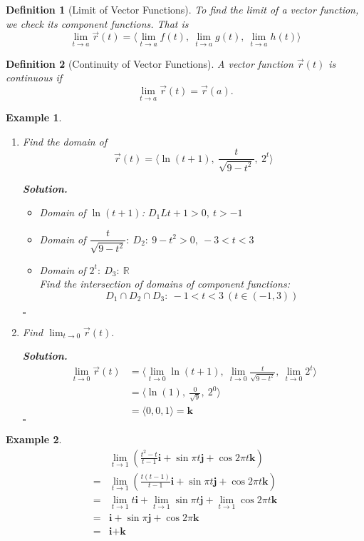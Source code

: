 \documentclass[12pt,a4paper]{article}
\newtheorem{df}{Definition}[subsection]
\newtheorem{eg}{Example}[subsection]
\newenvironment*{sol}{\par\indent\textbf{Solution. }}{\hfill{$\square$}\par}
\def\R{{\mathbb{R}}}
\def\vecr{\vec{r}}
\def\veci{\boldsymbol{\textbf{i}}}
\def\vecj{\boldsymbol{\textbf{j}}}
\def\veck{\boldsymbol{\textbf{k}}}
\begin{document}
\begin{df}[Limit of Vector Functions]
	To find the limit of a vector function, we check its component functions. That is \[\lim_{t\to a}\vecr(t)=\Big\langle\lim_{t\to a}f(t),\ \lim_{t\to a}g(t),\ \lim_{t\to a}h(t)\Big\rangle\]	
\end{df}
\begin{df}[Continuity of Vector Functions]
	A vector function $\vecr(t)$ is continuous if \[\lim_{t\to a}\vecr(t)=\vecr(a).\]	
\end{df}
\begin{eg}
	\begin{enumerate}
		\item Find the domain of \[\vecr(t)=\Big\langle\ln(t+1),\ \frac{t}{\sqrt{9-t^2}},\ 2^t\Big\rangle\]
		\begin{sol}
			\begin{itemize}
				\item Domain of $\ln(t+1)$: $D_1L t+1>0,\ t>-1$
				\item Domain of $\dfrac{t}{\sqrt{9-t^2}}:\ D_2:\ 9-t^2>0,\ -3<t<3$
				\item Domain of $2^t:\ D_3:\ \R$\\
				Find the intersection of domains of component functions: \[D_1\cap D_2\cap D_3:\ -1<t<3\ (t\in(-1,3))\]
			\end{itemize}	
		\end{sol}
		\item Find $\displaystyle\lim_{t\to0}\vecr(t).$
		\begin{sol}
			\[\begin{aligned}
			\lim_{t\to0}\vecr(t)&=\Big\langle\lim_{t\to0}\ln(t+1),\ \lim_{t\to0}\frac{t}{\sqrt{9-t^2}},\ \lim_{t\to0}2^t\Big\rangle\\
			&=\big\langle\ln(1),\ \frac{0}{\sqrt{9}},\ 2^0\big\rangle\\
			&=\langle0,0,1\rangle=\veck
			\end{aligned}\]
		\end{sol}
	\end{enumerate}	
\end{eg}
\begin{eg}
	\[\begin{aligned}
		&\lim_{t\to1}\left(\frac{t^2-t}{t-1}\veci+\sin\pi t\vecj+\cos2\pi t\veck\right)\\
		=&\lim_{t\to1}\left(\frac{t(t-1)}{t-1}\veci+\sin\pi t\vecj+\cos2\pi t\veck\right)\\
		=&\lim_{t\to1}t\veci+\lim_{t\to1}\sin\pi t\vecj+\lim_{t\to1}\cos2\pi t\veck\\
		=&\veci+\sin\pi\vecj+\cos2\pi\veck\\
		=&\veci+\veck
	\end{aligned}\]
\end{eg}
\end{document}
